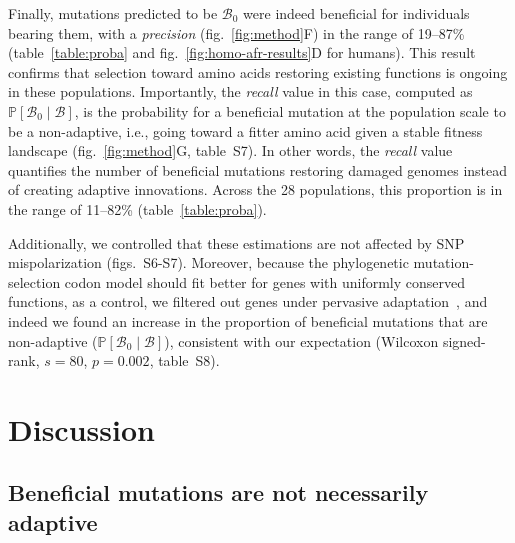 \documentclass{article}
\newcommand{\proba}{\mathbb{P}}
\newcommand{\SphyBen}{\mathcal{B}_0}
\newcommand{\given}{\mid}
\newcommand{\SpopBen}{\mathcal{B}}
\begin{document}
    Finally, mutations predicted to be $\SphyBen$ were indeed beneficial for individuals bearing them, with a \textit{precision} (fig.~\ref{fig:method}F) in the range of 19--87\% (table~\ref{table:proba} and fig.~\ref{fig:homo-afr-results}D for humans).
    This result confirms that selection toward amino acids restoring existing functions is ongoing in these populations.
    Importantly, the \textit{recall} value in this case, computed as $\proba [ \SphyBen  \given  \SpopBen]$, is the probability for a beneficial mutation at the population scale to be a non-adaptive, i.e., going toward a  fitter amino acid given a stable fitness landscape (fig.~\ref{fig:method}G, table~S7).
    In other words, the \textit{recall} value quantifies the number of beneficial mutations restoring damaged genomes instead of creating adaptive innovations.
    Across the 28 populations, this proportion is in the range of 11--82\% (table~\ref{table:proba}).

    Additionally, we controlled that these estimations are not affected by SNP mispolarization (figs.~S6-S7).
    Moreover, because the phylogenetic mutation-selection codon model should fit better for genes with uniformly conserved functions, as a control, we filtered out genes under pervasive adaptation~\cite{latrille_genes_2023}, and indeed we found an increase in the proportion of beneficial mutations that are non-adaptive ($\proba [ \SphyBen  \given  \SpopBen]$), consistent with our expectation (Wilcoxon signed-rank, $s=80$, $p=0.002$, table~S8).

    \section*{Discussion}
    \subsection*{Beneficial mutations are not necessarily adaptive}
\end{document}
